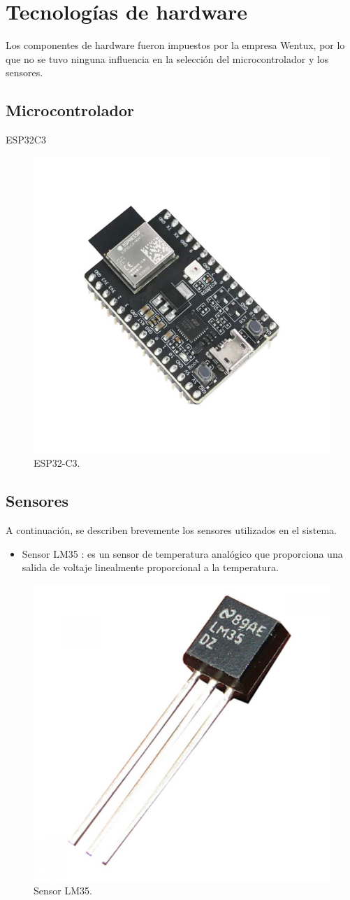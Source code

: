 \section{Tecnologías de hardware}

Los componentes de hardware fueron impuestos por la empresa Wentux, por lo que no se tuvo ninguna influencia en la selección del microcontrolador y los sensores.

\subsection{Microcontrolador}

ESP32C3

\begin{figure}[htpb]
    \centering
    \includegraphics[width=.3\textwidth]{./Figures/esp32c3.png}
    \caption{ESP32-C3.}
    \label{fig:esp32c3}
\end{figure}

\subsection{Sensores}

A continuación, se describen brevemente los sensores utilizados en el sistema.

\begin{itemize}
    \item Sensor LM35 \citep{sensor_lm35}: es un sensor de temperatura analógico que proporciona una salida de voltaje linealmente proporcional a la temperatura.
\end{itemize}

\begin{figure}[htpb]
    \centering
    \includegraphics[width=.2\textwidth]{./Figures/sensor_lm35.png}
    \caption{Sensor LM35.}
    \label{fig:lm35}
\end{figure}

